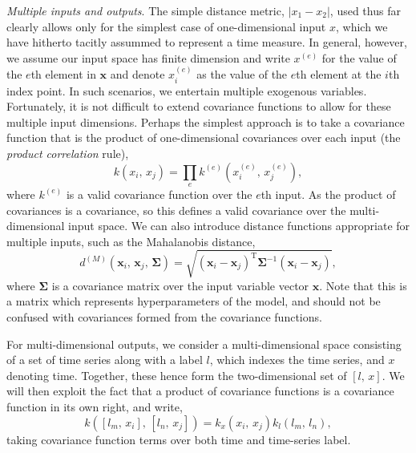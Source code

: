          \textit{Multiple inputs and outputs}. The simple distance metric, \(|x_{1} - x_{2}|\), used thus far clearly allows only for the simplest case of one-dimensional input \(x\), which we have hitherto tacitly assummed to represent a time measure. In general, however, we assume our input space has finite dimension and write \(x^{(e)}\) for the value of the \(e\)th element in \(\mathbf{x}\) and denote \(x_{i}^{(e)}\) as the value of the \(e\)th element at the \(i\)th index point. In such scenarios, we entertain multiple exogenous variables. Fortunately, it is not difficult to extend covariance functions to allow for these multiple input dimensions. Perhaps the simplest approach is to take a covariance function that is the product of one-dimensional covariances over each input (the \textit{product correlation} rule), \[k(x_{i}, \, x_{j}) = \prod_{e} k^{(e)} (x_{i}^{(e)}, \, x_{j}^{(e)}),\]
         where \(k^{(e)}\) is a valid covariance function over the \(e\)th input. As the product of covariances is a covariance, so this defines a valid covariance over the multi-dimensional input space. We can also introduce distance functions appropriate for multiple inputs, such as the Mahalanobis distance, \[d^{(M)}(\mathbf{x}_{i}, \, \mathbf{x}_{j}, \, \boldsymbol{\Sigma}) = \sqrt{(\mathbf{x}_{i} - \mathbf{x}_{j})^{\text{T}} \boldsymbol{\Sigma}^{-1} (\mathbf{x}_{i} - \mathbf{x}_{j})},\]
         where \(\boldsymbol{\Sigma}\) is a covariance matrix over the input variable vector \(\mathbf{x}\). Note that this is a matrix which represents hyperparameters of the model, and should not be confused with covariances formed from the covariance functions.

         For multi-dimensional outputs, we consider a multi-dimensional space consisting of a set of time series along with a label \(l\), which indexes the time series, and \(x\) denoting time. Together, these hence form the two-dimensional set of \([l, \, x]\). We will then exploit the fact that a product of covariance functions is a covariance function in its own right, and write, \[k([l_{m}, \, x_{i}], \, [l_{n}, \, x_{j}]) = k_{x} (x_{i}, \, x_{j}) k_{l} (l_{m}, \, l_{n}),\] taking covariance function terms over both time and time-series label.

         \vspace{1em}

